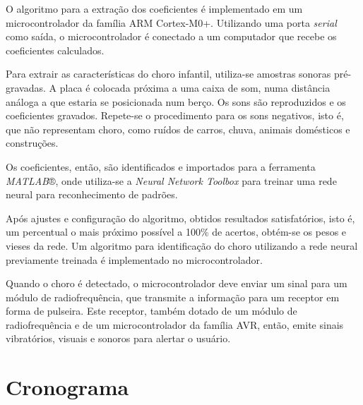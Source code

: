 \documentclass[a4paper, 12pt]{article}
\begin{document}
		O algoritmo para a extração dos coeficientes é implementado em um microcontrolador da família ARM Cortex-M0+. Utilizando uma porta \textit{serial} como saída, o microcontrolador é conectado a um computador que recebe os coeficientes calculados.
		
		Para extrair as características do choro infantil, utiliza-se amostras sonoras pré-gravadas. A placa é colocada próxima a uma caixa de som, numa distância análoga a que estaria se posicionada num berço. Os sons são reproduzidos e os coeficientes gravados.
		Repete-se o procedimento para os sons negativos, isto é, que não representam choro, como ruídos de carros, chuva, animais domésticos e construções.
		
		Os coeficientes, então, são identificados e importados para a ferramenta \textit{MATLAB}®, onde utiliza-se a \textit{Neural Network Toolbox} para treinar uma rede neural para reconhecimento de padrões. 
		
		Após ajustes e configuração do algoritmo, obtidos resultados satisfatórios, isto é, um percentual o mais próximo possível a 100\% de acertos, obtém-se os pesos e vieses da rede. Um algoritmo para identificação do choro utilizando a rede neural previamente treinada é implementado no microcontrolador.
		
		Quando o choro é detectado, o microcontrolador deve enviar um sinal para um módulo de radiofrequência, que transmite a informação para um receptor em forma de pulseira. Este receptor, também dotado de um módulo de radiofrequência e de um microcontrolador da família AVR, então, emite sinais vibratórios, visuais e sonoros para alertar o usuário.
	\newpage
	\section{Cronograma}

	\centering
\end{document}

